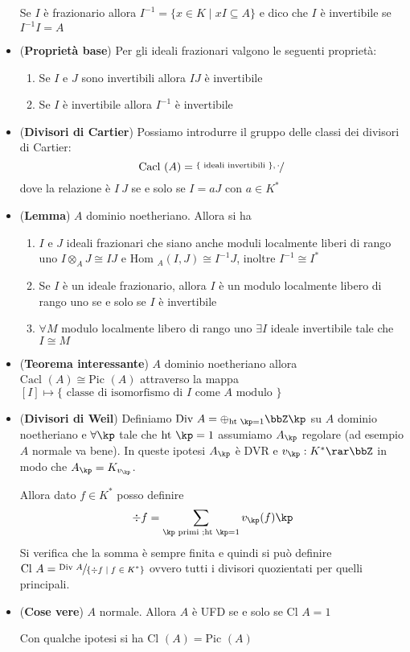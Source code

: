 \documentclass[a4paper,NoNotes,GeneralMath]{stdmdoc}
\newcommand{\Ht}{\text{ht }}
\newcommand{\Hom}{\text{Hom }}
\newcommand{\Cacl}{\text{Cacl }}
\newcommand{\Pic}{\text{Pic }}
\newcommand{\Div}{\text{Div }}
\newcommand{\Cl}{\text{Cl }}
\begin{document}
\begin{itemize}
  Se $I$ è frazionario allora
  $I^{-1} = \{ x \in K \mid xI \subseteq A \}$ e dico che $I$ è
  invertibile se $I^{-1} I = A$
\item ({\bf Proprietà base}) Per gli ideali frazionari valgono le
  seguenti proprietà:
  \begin{enumerate}
  \item Se $I$ e $J$ sono invertibili allora $IJ$ è invertibile
  \item Se $I$ è invertibile allora $I^{-1}$ è invertibile
  \end{enumerate}
\item ({\bf Divisori di Cartier}) Possiamo introdurre il gruppo delle
  classi dei divisori di Cartier:
  $$ \Cacl (A) = \sfrac{\{\text{ ideali invertibili }\}, \cdot}{~} $$
  dove la relazione è $I ~ J$ se e solo se $I = aJ$ con $a \in K^*$
\item ({\bf Lemma}) $A$ dominio noetheriano. Allora si ha
  \begin{enumerate}
  \item $I$ e $J$ ideali frazionari che siano anche moduli localmente
    liberi di rango uno $I \otimes_A J \cong IJ$ e
    $\Hom_A(I, J) \cong I^{-1}J$, inoltre $I^{-1} \cong I^*$
  \item Se $I$ è un ideale frazionario, allora $I$ è un modulo
    localmente libero di rango uno se e solo se $I$ è invertibile
  \item $\forall M$ modulo localmente libero di rango uno $\exists I$
    ideale invertibile tale che $I \cong M$
  \end{enumerate}
\item ({\bf Teorema interessante}) $A$ dominio noetheriano allora $\Cacl
  (A) \cong \Pic (A)$ attraverso la mappa $[I] \mapsto \{\text{ classe
    di isomorfismo di } I \text{ come } A \text{ modulo }\}$
\item ({\bf Divisori di Weil}) Definiamo
  $\Div A = \oplus_{\Ht \kp = 1} \bbZ \kp$ su $A$ dominio noetheriano e
  $\forall \kp$ tale che $\Ht \kp = 1$ assumiamo $A_\kp$ regolare (ad
  esempio $A$ normale va bene). In queste ipotesi $A_\kp$ è DVR e
  $v_\kp: K^* \rar \bbZ$ in modo che $A_\kp = K_{v_\kp}$.

  Allora dato $f \in K^*$ posso definire
  $$ \div f = \sum_{\substack{ \kp \text{ primi }; \Ht \kp = 1 }} v_\kp(f)
  \kp $$ Si verifica che la somma è sempre finita e quindi si può
  definire $\Cl A = \sfrac{\Div A}{\{ \div f \mid f \in K^*\}}$ ovvero
  tutti i divisori quozientati per quelli principali.
\item ({\bf Cose vere}) $A$ normale. Allora $A$ è UFD se e solo se
  $\Cl A = 1$

  Con qualche ipotesi si ha $\Cl (A) = \Pic (A)$
\end{itemize}
\end{document}
